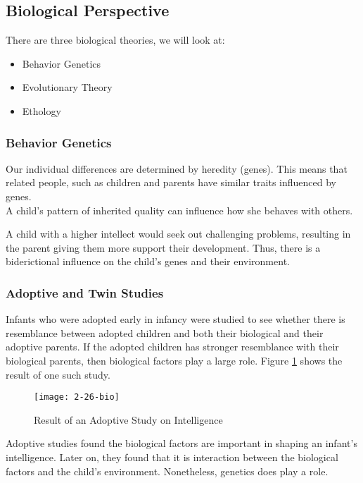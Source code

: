 \documentclass[../main/main.tex]{subfiles}
\begin{document}
\subsection{Biological Perspective}
There are three biological theories, we will look at:
\begin{itemize}
\item Behavior Genetics
        \item  Evolutionary Theory
        \item Ethology
\end{itemize}

\subsubsection{Behavior Genetics}
Our individual differences are determined by heredity (genes). This means that related people, such as children and parents have similar traits influenced by genes.\\

A child's pattern of inherited quality can influence how she behaves with others.
\begin{example}
  A child with a higher intellect would seek out challenging problems, resulting in the parent giving them more support their development. Thus, there is a biderictional influence on the child's genes and their environment.
\end{example}

\subsubsection{Adoptive and Twin Studies}
Infants who were adopted early in infancy were studied to see whether there is resemblance between adopted children and both their biological and their adoptive parents. If the adopted children has stronger resemblance with their biological parents, then biological factors play a large role. Figure \ref{2-26-bio} shows the result of one such study.

\begin{figure}[htpb]
  \centering
  \texttt{[image: 2-26-bio]}
  \caption{Result of an Adoptive Study on Intelligence}
  \label{2-26-bio}
\end{figure}
Adoptive studies found the biological factors are important in shaping an infant's intelligence. Later on, they found that it is interaction between the biological factors and the child's environment. Nonetheless, genetics does play a role.\\
\end{document}
